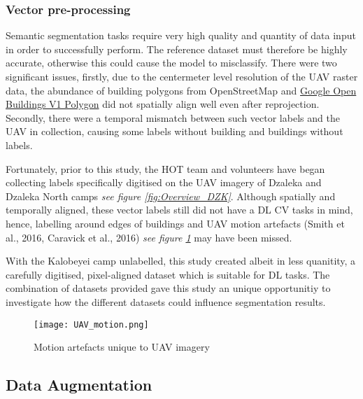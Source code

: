 \documentclass[11pt, a4paper, twoside]{report}
\begin{document}
\subsubsection{Vector pre-processing}

Semantic segmentation tasks require very high quality and quantity of data input in order to successfully perform. The reference dataset must therefore be highly accurate, otherwise this could cause the model to misclassify. There were two significant issues, firstly, due to the centermeter level resolution of the UAV raster data, the abundance of building polygons from OpenStreetMap and \href{https://developers.google.com/earth-engine/datasets/catalog/GOOGLE_Research_open-buildings_v1_polygons}{Google Open Buildings V1 Polygon} did not spatially align well even after reprojection. Secondly, there were a temporal mismatch between such vector labels and the UAV in collection, causing some labels without building and buildings without labels.\\\par

Fortunately, prior to this study, the HOT team and volunteers have began collecting labels specifically digitised on the UAV imagery of Dzaleka and Dzaleka North camps \textit{see figure \ref{fig:Overview_DZK}}. Although spatially and temporally aligned, these vector labels still did not have a DL CV tasks in mind, hence, labelling around edges of buildings and UAV motion artefacts (Smith et al., 2016, Caravick et al., 2016) \textit{see figure \ref{fig:UAV_motion}} may have been missed.\\\par

With the Kalobeyei camp unlabelled, this study created albeit in less quanitity, a carefully digitised, pixel-aligned dataset which is suitable for DL tasks. The combination of datasets provided gave this study an unique opportunitiy to investigate how the different datasets could influence segmentation results.\\\par

\begin{figure}[H]
  \centering
  \texttt{[image: UAV\_motion.png]}
  \caption{Motion artefacts unique to UAV imagery}
  \label{fig:UAV_motion}
\end{figure}


\subsection{Data Augmentation}\label{DataAug}
\end{document}
